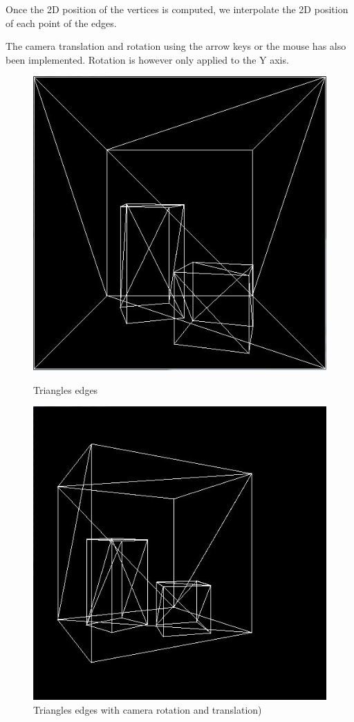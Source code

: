 Once the 2D position of the vertices is computed, we interpolate the 2D position of each point of the edges.

The camera translation and rotation using the arrow keys or the mouse has also been implemented. Rotation is however only applied to the Y axis.

\begin{figure}[H]
\centering
{}
    \centering
    \includegraphics[width=\linewidth]{img/edges1.jpg}
    \caption{Triangles edges}
\endminipage
{}
    \centering
    \includegraphics[width=\linewidth]{img/edges2.jpg}
    \caption{Triangles edges with camera rotation and translation)}
\endminipage
\end{figure}

